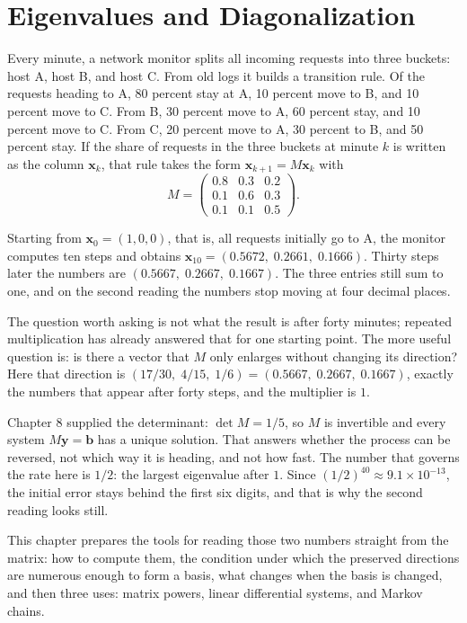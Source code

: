\chapter{Eigenvalues and Diagonalization}

Every minute, a network monitor splits all incoming requests into three buckets: host A, host B,
and host C. From old logs it builds a transition rule. Of the requests heading to A, 80 percent
stay at A, 10 percent move to B, and 10 percent move to C. From B, 30 percent move to A, 60
percent stay, and 10 percent move to C. From C, 20 percent move to A, 30 percent to B, and 50
percent stay. If the share of requests in the three buckets at minute $k$ is written as the
column $\mathbf{x}_{k}$, that rule takes the form
$\mathbf{x}_{k+1}=M\mathbf{x}_{k}$ with
\[
  M=\begin{pmatrix}0.8&0.3&0.2\\ 0.1&0.6&0.3\\ 0.1&0.1&0.5\end{pmatrix}.
\]

Starting from $\mathbf{x}_{0}=(1,0,0)$, that is, all requests initially go to A, the monitor
computes ten steps and obtains
$\mathbf{x}_{10}=(0.5672,\;0.2661,\;0.1666)$. Thirty steps later the numbers are
$(0.5667,\;0.2667,\;0.1667)$. The three entries still sum to one, and on the second reading the
numbers stop moving at four decimal places.

The question worth asking is not what the result is after forty minutes; repeated multiplication
has already answered that for one starting point. The more useful question is: is there a vector
that $M$ only enlarges without changing its direction? Here that direction is
$(17/30,\;4/15,\;1/6)=(0.5667,\;0.2667,\;0.1667)$, exactly the numbers that appear after forty
steps, and the multiplier is $1$.

Chapter 8 supplied the determinant: $\det M=1/5$, so $M$ is invertible and every system
$M\mathbf{y}=\mathbf{b}$ has a unique solution. That answers whether the process can be reversed,
not which way it is heading, and not how fast. The number that governs the rate here is $1/2$: the
largest eigenvalue after $1$. Since $(1/2)^{40}\approx9.1\times10^{-13}$, the initial error stays
behind the first six digits, and that is why the second reading looks still.

This chapter prepares the tools for reading those two numbers straight from the matrix: how to
compute them, the condition under which the preserved directions are numerous enough to form a
basis, what changes when the basis is changed, and then three uses: matrix powers, linear
differential systems, and Markov chains.

